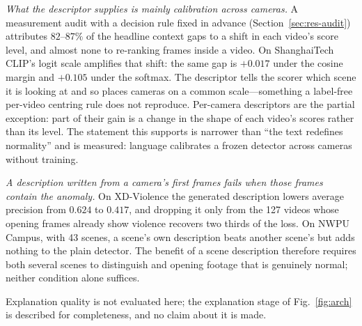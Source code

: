 \documentclass[a4paper,fleqn]{cas-sc}
\begin{document}
\emph{What the descriptor supplies is mainly calibration across cameras.} A
measurement audit with a decision rule fixed in advance
(Section~\ref{sec:res-audit}) attributes $82$--$87\%$ of the headline context
gaps to a shift in each video's score level, and almost none to re-ranking frames
inside a video. On ShanghaiTech CLIP's logit scale amplifies that shift: the
same gap is $+0.017$ under the cosine margin and $+0.105$ under the softmax. The
descriptor tells the scorer which scene it is looking at and so places cameras on
a common scale---something a label-free per-video centring rule does not
reproduce. Per-camera descriptors are the partial exception: part of their gain
is a change in the shape of each video's scores rather than its level. The
statement this supports is narrower than ``the text redefines normality'' and is
measured: language calibrates a frozen detector across cameras without training.

\emph{A description written from a camera's first frames fails when those frames
contain the anomaly.} On XD-Violence the generated description lowers average
precision from $0.624$ to $0.417$, and dropping it only from the 127 videos whose
opening frames already show violence recovers two thirds of the loss. On NWPU
Campus, with 43 scenes, a scene's own description beats another scene's but adds
nothing to the plain detector. The benefit of a scene description therefore
requires both several scenes to distinguish and opening footage that is genuinely
normal; neither condition alone suffices.

Explanation quality is not evaluated here; the explanation stage of
Fig.~\ref{fig:arch} is described for completeness, and no claim about it is made.
\end{document}
